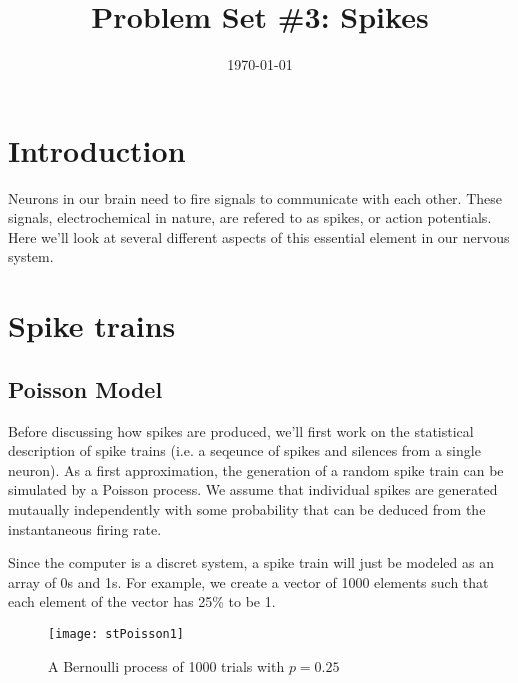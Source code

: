 

\pagestyle{fancy} 
\rfoot{\thepage}
\cfoot{}
\lfoot{}
\renewcommand{\headrulewidth}{0.4pt}
\renewcommand{\footrulewidth}{0.4pt}


\title{Problem Set \#3: Spikes \vspace{-0.5em}}
\preauthor{} \postauthor{} 
\author{}
\date{\today}
\maketitle

\thispagestyle{fancy}


\section*{Introduction}

Neurons in our brain need to fire signals to communicate with each other. 
These signals, electrochemical in nature, are refered to as spikes, or action
potentials. Here we'll look at several different aspects of this essential
element in our nervous system.


\section{Spike trains}

\subsection{Poisson Model}

Before discussing how spikes are produced, we'll first work on the
statistical description of spike trains (i.e. a seqeunce of spikes and 
silences from a single neuron). As a first approximation, the generation of 
a random spike train can be simulated by a Poisson process. We assume that
individual spikes are generated mutaually independently with some probability 
that can be deduced from the instantaneous firing rate. 

Since the computer is a discret system, a spike train will just be modeled as
an array of 0s and 1s. For example, we create a vector of 1000 elements 
such that each element of the vector has 25\% to be 1.

\begin{figure}[H]
  \centering
  \texttt{[image: stPoisson1]}
  \caption{A Bernoulli process of 1000 trials with $p = 0.25$}
\end{figure}

